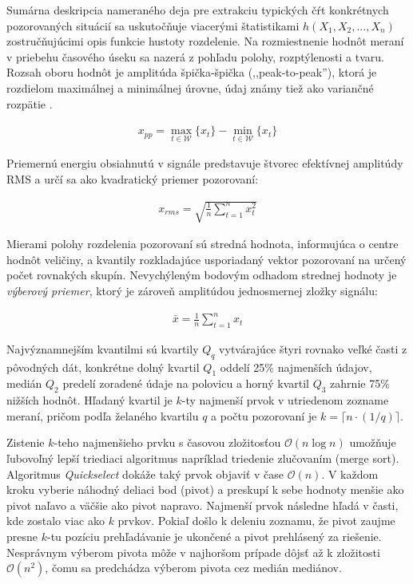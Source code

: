 Sumárna deskripcia nameraného deja pre extrakciu typických čŕt konkrétnych pozorovaných situácií sa uskutočňuje viacerými štatistikami
$h(X_1, X_2, ..., X_n)$ zostručňujúcimi opis funkcie hustoty rozdelenie. Na rozmiestnenie hodnôt meraní v priebehu časového úseku 
sa nazerá z pohľadu polohy, rozptýlenosti a tvaru. Rozsah oboru hodnôt je amplitúda špička-špička (,,peak-to-peak''), 
ktorá je rozdielom maximálnej a minimálnej úrovne, údaj známy tiež ako variančné rozpätie \cite{zaklady-statistiky}.
\begin{ceqn}\begin{align}
x_{pp} = \max_{t \in \mathcal{W}}\{x_t\} - \min_{t \in \mathcal{W}}\{x_t\}
\end{align}\end{ceqn} 
Priemernú energiu obsiahnutú v signále predstavuje štvorec efektívnej amplitúdy RMS a určí sa ako kvadratický priemer pozorovaní:
\begin{ceqn}\begin{align}
x_{rms} = \sqrt{\frac{1}{n}\sum_{t=1}^{n}{x_t^2}}
\end{align}\end{ceqn}
Mierami polohy rozdelenia pozorovaní sú stredná hodnota, informujúca
o centre hodnôt veličiny, a kvantily rozkladajúce usporiadaný vektor pozorovaní na určený počet rovnakých skupín.
Nevychýleným bodovým odhadom strednej hodnoty je \emph{výberový priemer}, ktorý je zároveň amplitúdou jednosmernej zložky signálu:
\begin{ceqn}\begin{align}
\bar{x} = \frac{1}{n} \sum_{t = 1}^{n}{x_t}
\end{align}\end{ceqn}
Najvýznamnejším kvantilmi sú kvartily $Q_q$ vytvárajúce štyri rovnako veľké časti z pôvodných dát, konkrétne dolný kvartil $Q_1$ 
oddelí  25\% najmenších údajov, medián $Q_2$ predelí zoradené údaje na polovicu a horný kvartil $Q_3$ zahrnie 75\% nižších hodnôt. 
Hľadaný kvartil je $k$-ty najmenší prvok v utriedenom zozname meraní, pričom podľa želaného kvartilu $q$ a počtu pozorovaní je 
$k = \lceil n \cdot (1 / q) \rceil$. 

Zistenie $k$-teho najmenšieho prvku s časovou zložitosťou $\mathcal{O}(n \log n)$ umožňuje ľubovoľný lepší triediaci algoritmus
napríklad triedenie zlučovaním (merge sort). Algoritmus \emph{Quickselect} dokáže taký prvok objaviť v čase $\mathcal{O}(n)$. 
V každom kroku vyberie náhodný deliaci bod (pivot) a preskupí k sebe hodnoty menšie ako pivot naľavo a väčšie ako pivot 
napravo. Najmenší prvok následne hľadá v časti, kde zostalo viac ako $k$ prvkov. Pokiaľ došlo k deleniu zoznamu, že pivot
zaujme presne $k$-tu pozíciu prehľadávanie je ukončené a pivot prehlásený za riešenie. Nesprávnym výberom pivota môže 
v najhoršom prípade dôjsť až k zložitosti $\mathcal{O}(n^2)$, čomu sa predchádza výberom pivota cez medián mediánov.

